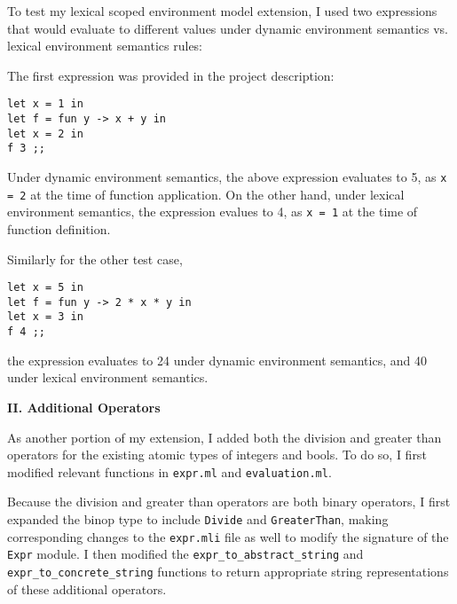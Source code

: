 \documentclass[12pt]{extarticle}
\begin{document}
\vspace{0.3cm}
To test my lexical scoped environment model extension, I used two expressions that would evaluate to different values under dynamic environment semantics vs. lexical environment semantics rules:

\vspace{0.3cm}
The first expression was provided in the project description:

\footnotesize
\begin{verbatim}
let x = 1 in
let f = fun y -> x + y in
let x = 2 in
f 3 ;;
\end{verbatim}

\normalsize
Under dynamic environment semantics, the above expression evaluates to 5, as \texttt{x = 2} at the time of function application. On the other hand, under lexical environment semantics, the expression evalues to 4, as \texttt{x = 1} at the time of function definition.

\vspace{0.3cm}
Similarly for the other test case,

\footnotesize
\begin{verbatim}
let x = 5 in 
let f = fun y -> 2 * x * y in 
let x = 3 in 
f 4 ;;
\end{verbatim}

\normalsize
the expression evaluates to 24 under dynamic environment semantics, and 40 under lexical environment semantics.

\vspace{0.5cm}
\large \textbf{II. Additional Operators}

\vspace{0.3cm}
\normalsize
As another portion of my extension, I added both the division and greater than operators for the existing atomic types of integers and bools. To do so, I first modified relevant functions in \texttt{expr.ml} and \texttt{evaluation.ml}.

\vspace{0.3cm}
Because the division and greater than operators are both binary operators, I first expanded the binop type to include \texttt{Divide} and \texttt{GreaterThan}, making corresponding changes to the \texttt{expr.mli} file as well to modify the signature of the \texttt{Expr} module. I then modified the \texttt{expr_to_abstract_string} and \texttt{expr_to_concrete_string} functions to return appropriate string representations of these additional operators.
\end{document}
